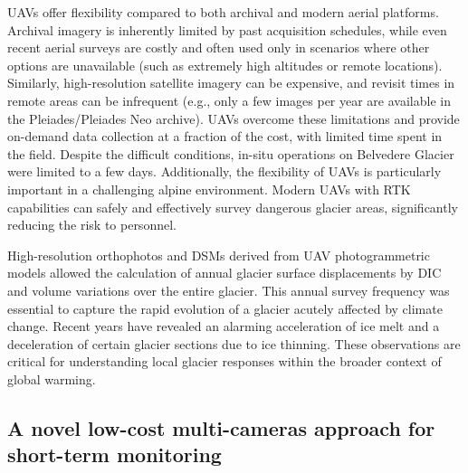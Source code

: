 UAVs offer flexibility compared to both archival and modern aerial platforms. 
Archival imagery is inherently limited by past acquisition schedules, while even recent aerial surveys are costly and often used only in scenarios where other options are unavailable (such as extremely high altitudes or remote locations). 
Similarly, high-resolution satellite imagery can be expensive, and revisit times in remote areas can be infrequent (e.g., only a few images per year are available in the Pleiades/Pleiades Neo archive).
UAVs overcome these limitations and provide on-demand data collection at a fraction of the cost, with limited time spent in the field.
Despite the difficult conditions, in-situ operations on Belvedere Glacier were limited to a few days. 
Additionally, the flexibility of UAVs is particularly important in a challenging alpine environment.
Modern UAVs with RTK capabilities can safely and effectively survey dangerous glacier areas, significantly reducing the risk to personnel.

High-resolution orthophotos and DSMs derived from UAV photogrammetric models allowed the calculation of annual glacier surface displacements by DIC and volume variations over the entire glacier.
This annual survey frequency was essential to capture the rapid evolution of a glacier acutely affected by climate change. 
Recent years have revealed an alarming acceleration of ice melt and a deceleration of certain glacier sections due to ice thinning.  
These observations are critical for understanding local glacier responses within the broader context of global warming.

\subsection*{A novel low-cost multi-cameras approach for short-term monitoring}

